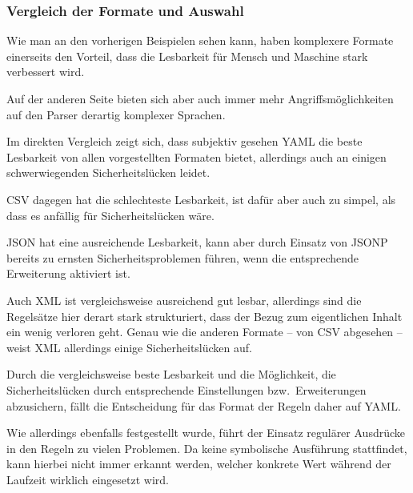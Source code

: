             \subsubsection{Vergleich der Formate und Auswahl}\label{Vergleich der Formate und Auswahl}
                Wie man an den vorherigen Beispielen sehen kann,
                haben komplexere Formate einerseits den Vorteil,
                dass die Lesbarkeit für Mensch und
                Maschine stark verbessert wird.

                Auf der anderen Seite bieten sich aber auch immer mehr Angriffsmöglichkeiten auf den Parser derartig komplexer Sprachen.

                Im direkten Vergleich zeigt sich,
                dass subjektiv gesehen
                \gls{YAML} die beste Lesbarkeit von allen vorgestellten Formaten bietet,
                allerdings auch an einigen schwerwiegenden Sicherheitslücken leidet.

                \gls{CSV} dagegen hat die schlechteste Lesbarkeit,
                ist dafür aber auch zu simpel,
                als dass es anfällig für Sicherheitslücken wäre.

                \gls{JSON} hat eine ausreichende Lesbarkeit,
                kann aber durch Einsatz von
                \gls{JSONP} bereits zu ernsten Sicherheitsproblemen führen,
                wenn die entsprechende Erweiterung aktiviert ist.

                Auch
                \gls{XML} ist vergleichsweise ausreichend gut lesbar,
                allerdings sind die Regelsätze hier derart stark strukturiert,
                dass der Bezug zum eigentlichen Inhalt ein wenig verloren geht.
                Genau wie die anderen Formate
                -- von
                \gls{CSV} abgesehen
                -- weist
                \gls{XML} allerdings einige Sicherheitslücken auf.

                Durch die vergleichsweise beste Lesbarkeit und
                die Möglichkeit,
                die Sicherheitslücken durch entsprechende Einstellungen bzw.\ Erweiterungen abzusichern,
                fällt die Entscheidung für das Format der Regeln daher auf
                \gls{YAML}.

                Wie allerdings ebenfalls festgestellt wurde,
                führt der Einsatz regulärer Ausdrücke in den Regeln zu vielen Problemen.
                Da keine symbolische Ausführung stattfindet,
                kann hierbei nicht immer erkannt werden,
                welcher konkrete Wert während der Laufzeit wirklich eingesetzt wird.

